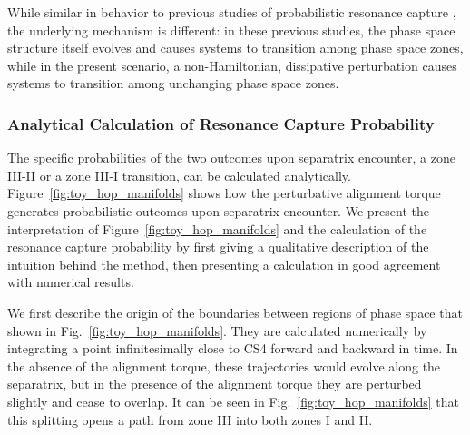 \documentclass[
        fleqn,
        usenatbib,
    ]{mnras}
\begin{document}
While similar in behavior to previous studies of probabilistic resonance capture
\citep{henrard1982, su2020}, the underlying mechanism is different: in these
previous studies, the phase space structure itself evolves and causes systems to
transition among phase space zones, while in the present scenario, a
non-Hamiltonian, dissipative perturbation causes systems to transition among
unchanging phase space zones.

\subsubsection{Analytical Calculation of Resonance Capture Probability}

The specific probabilities of the two outcomes upon separatrix encounter, a zone
III-II or a zone III-I transition, can be calculated analytically.
Figure~\ref{fig:toy_hop_manifolds} shows how the perturbative alignment torque
generates probabilistic outcomes upon separatrix encounter. We present the
interpretation of Figure~\ref{fig:toy_hop_manifolds} and the calculation of the
resonance capture probability by first giving a qualitative description of the
intuition behind the method, then presenting a calculation in good agreement with
numerical results.

We first describe the origin of the boundaries between regions of phase space
that shown in Fig.~\ref{fig:toy_hop_manifolds}. They are calculated numerically
by integrating a point infinitesimally close to CS4 forward and backward in
time. In the absence of the alignment torque, these trajectories would evolve
along the separatrix, but in the presence of the alignment torque they are
perturbed slightly and cease to overlap. It can be seen in
Fig.~\ref{fig:toy_hop_manifolds} that this splitting opens a path from zone III
into both zones I and II\@.
\end{document}
